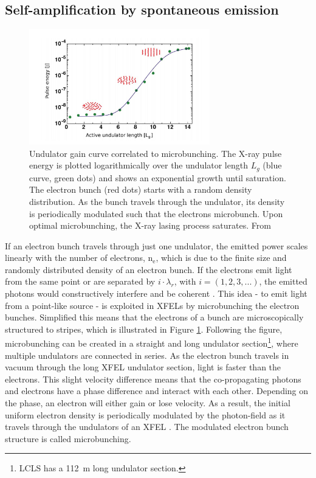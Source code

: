 \subsection{Self-amplification by spontaneous emission}\label{sec:sase}
\begin{figure}
	\centering
		\includegraphics[width=0.7\textwidth]{images/gain-length.JPG}
	\caption[Undulator gain curve correlated to microbunching.]{Undulator gain curve correlated to microbunching. The X-ray pulse energy is plotted logarithmically over the undulator length $L_{g}$ (blue curve, green dots) and shows an exponential growth until saturation. The electron bunch (red dots) starts with a random density distribution. As the bunch travels through the undulator, its density is periodically modulated such that the electrons microbunch. Upon optimal microbunching, the X-ray lasing process saturates. From \citep{Rupp-2013-Thesis,Rupp-2016-Springer}}
	\label{fig:gain-length}
\end{figure}
If an electron bunch travels through just one undulator, the emitted power scales linearly with the number of electrons, n$_{\text{e}}$, which is due to the finite size and randomly distributed density of an electron bunch. If the electrons emit light from the same point or are separated by $i\cdot \lambda_{r}$, with $i=\left(1, 2, 3, ...\right)$, the emitted photons would constructively interfere and be coherent \cite{Als-Nielson-2011-JWS}. This idea - to emit light from a point-like source - is exploited in XFELs by microbunching the electron bunches. Simplified this means that the electrons of a bunch are microscopically structured to stripes, which is illustrated in Figure \ref{fig:gain-length}. Following the figure, microbunching can be created in a straight and long undulator section\footnote{LCLS has a \SI{112}{\meter} long undulator section.}, where multiple undulators are connected in series. As the electron bunch travels in vacuum through the long XFEL undulator section, light is faster than the electrons. This slight velocity difference means that the co-propagating photons and electrons have a phase difference and interact with each other. Depending on the phase, an electron will either gain or lose velocity. As a result, the initial uniform electron density is periodically modulated by the photon-field as it travels through the undulators of an XFEL \cite{Huang-2007-PRSTAB}. The modulated electron bunch structure is called microbunching.\\[1\baselineskip]
